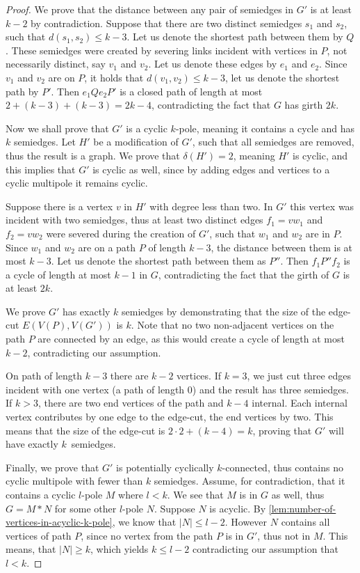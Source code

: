 \documentclass[12pt, twoside]{book}
\begin{document}
\begin{proof}
	We prove that the distance between any pair of semiedges in $G'$ is at least $k-2$ by contradiction. Suppose that there are two distinct semiedges $s_1$ and $s_2$, such that ${d(s_1,s_2)\leq k-3}$. Let us denote the shortest path between them by $Q$. These semiedges were created by severing links incident with vertices in $P$, not necessarily distinct, say $v_1$ and $v_2$. Let us denote these edges by $e_1$ and $e_2$. Since $v_1$ and $v_2$ are on $P$, it holds that $d(v_1,v_2)\leq k-3$, let us denote the shortest path by $P'$. Then $e_1Qe_2P'$ is a closed path of length at most $2+(k-3)+(k-3)=2k-4$, contradicting the fact that $G$ has girth $2k$.
	
	Now we shall prove that $G'$ is a cyclic $k$-pole, meaning it contains a cycle and has $k$ semiedges. Let $H'$ be a modification of $G'$, such that all semiedges are removed, thus the result is a graph. We prove that $\delta(H')=2$, meaning $H'$ is cyclic, and this implies that $G'$ is cyclic as well, since by adding edges and vertices to a cyclic multipole it remains cyclic.
	
	Suppose there is a vertex $v$ in $H'$ with degree less than two. In $G'$ this vertex was incident with two semiedges, thus at least two distinct edges ${f_1=vw_1}$ and ${f_2=vw_2}$ were severed during the creation of $G'$, such that $w_1$ and $w_2$ are in $P$. Since $w_1$ and $w_2$ are on a path $P$ of length $k-3$, the distance between them is at most $k-3$. Let us denote the shortest path between them as $P''$. Then $f_1P''f_2$ is a cycle of length at most $k-1$ in $G$, contradicting the fact that the girth of $G$ is at least $2k$.
	
	We prove $G'$ has exactly $k$ semiedges by demonstrating that the size of the edge-cut $E\left(V(P), V(G')\right)$ is $k$. Note that no two non-adjacent vertices on the path $P$ are connected by an edge, as this would create a cycle of length at most $k-2$, contradicting our assumption.
	
	On path of length $k-3$ there are $k-2$ vertices. If $k=3$, we just cut three edges incident with one vertex (a path of length 0) and the result has three semiedges. If $k > 3$, there are two end vertices of the path and $k-4$ internal. Each internal vertex contributes by one edge to the edge-cut, the end vertices by two. This means that the size of the edge-cut is $2\cdot 2 + (k-4)=k$, proving that $G'$ will have exactly $k$~semiedges.
	
	Finally, we prove that $G'$ is potentially cyclically $k$-connected, thus contains no cyclic multipole with fewer than $k$ semiedges. Assume, for contradiction, that it contains a cyclic $l$-pole $M$ where $l<k$. We see that $M$ is in $G$ as well, thus $G=M*N$ for some other $l$-pole $N$. Suppose $N$ is acyclic. By \cref{lem:number-of-vertices-in-acyclic-k-pole}, we know that $|N|\leq l-2$. However $N$ contains all vertices of path $P$, since no vertex from the path $P$ is in $G'$, thus not in $M$. This means, that $|N|\geq k$, which yields $k\leq l-2$ contradicting our assumption that $l<k$.
	

\end{proof}
\end{document}
